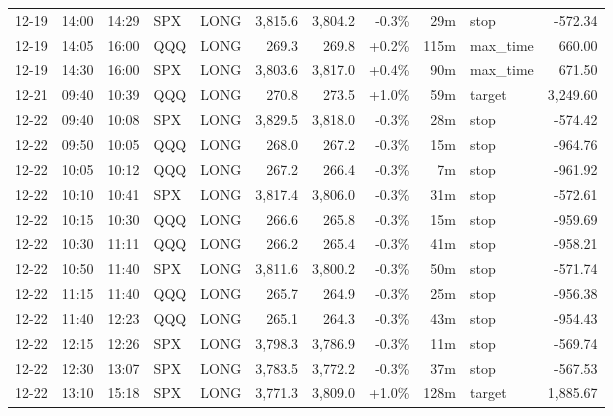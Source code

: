 \documentclass[11pt,a4paper,twoside]{article}
\begin{document}
\begin{center}
\begin{longtable}{>{\color{txtmain}}l l l l l r r r r >{\color{txtmain}}l r}
12-19 & 14:00 & 14:29 & SPX & LONG & 3,815.6 & 3,804.2 & \textcolor{lossred}{-0.3\%} & 29m & stop & \textcolor{lossred}{-572.34} \\
12-19 & 14:05 & 16:00 & QQQ & LONG & 269.3 & 269.8 & \textcolor{wingreen}{+0.2\%} & 115m & max\_time & \textcolor{wingreen}{660.00} \\
12-19 & 14:30 & 16:00 & SPX & LONG & 3,803.6 & 3,817.0 & \textcolor{wingreen}{+0.4\%} & 90m & max\_time & \textcolor{wingreen}{671.50} \\
12-21 & 09:40 & 10:39 & QQQ & LONG & 270.8 & 273.5 & \textcolor{wingreen}{+1.0\%} & 59m & target & \textcolor{wingreen}{3,249.60} \\
12-22 & 09:40 & 10:08 & SPX & LONG & 3,829.5 & 3,818.0 & \textcolor{lossred}{-0.3\%} & 28m & stop & \textcolor{lossred}{-574.42} \\
12-22 & 09:50 & 10:05 & QQQ & LONG & 268.0 & 267.2 & \textcolor{lossred}{-0.3\%} & 15m & stop & \textcolor{lossred}{-964.76} \\
12-22 & 10:05 & 10:12 & QQQ & LONG & 267.2 & 266.4 & \textcolor{lossred}{-0.3\%} & 7m & stop & \textcolor{lossred}{-961.92} \\
12-22 & 10:10 & 10:41 & SPX & LONG & 3,817.4 & 3,806.0 & \textcolor{lossred}{-0.3\%} & 31m & stop & \textcolor{lossred}{-572.61} \\
12-22 & 10:15 & 10:30 & QQQ & LONG & 266.6 & 265.8 & \textcolor{lossred}{-0.3\%} & 15m & stop & \textcolor{lossred}{-959.69} \\
12-22 & 10:30 & 11:11 & QQQ & LONG & 266.2 & 265.4 & \textcolor{lossred}{-0.3\%} & 41m & stop & \textcolor{lossred}{-958.21} \\
12-22 & 10:50 & 11:40 & SPX & LONG & 3,811.6 & 3,800.2 & \textcolor{lossred}{-0.3\%} & 50m & stop & \textcolor{lossred}{-571.74} \\
12-22 & 11:15 & 11:40 & QQQ & LONG & 265.7 & 264.9 & \textcolor{lossred}{-0.3\%} & 25m & stop & \textcolor{lossred}{-956.38} \\
12-22 & 11:40 & 12:23 & QQQ & LONG & 265.1 & 264.3 & \textcolor{lossred}{-0.3\%} & 43m & stop & \textcolor{lossred}{-954.43} \\
12-22 & 12:15 & 12:26 & SPX & LONG & 3,798.3 & 3,786.9 & \textcolor{lossred}{-0.3\%} & 11m & stop & \textcolor{lossred}{-569.74} \\
12-22 & 12:30 & 13:07 & SPX & LONG & 3,783.5 & 3,772.2 & \textcolor{lossred}{-0.3\%} & 37m & stop & \textcolor{lossred}{-567.53} \\
12-22 & 13:10 & 15:18 & SPX & LONG & 3,771.3 & 3,809.0 & \textcolor{wingreen}{+1.0\%} & 128m & target & \textcolor{wingreen}{1,885.67} \\

\end{longtable}
\end{center}
\end{document}
